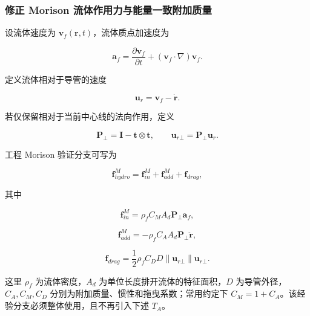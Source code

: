 \subsubsection{修正 Morison 流体作用力与能量一致附加质量}\label{sec:rod-1-4-4}

设流体速度为 \(\mathbf{v}_{f}\left( \mathbf{r},t \right)\)，流体质点加速度为

\begin{equation}
\label{eq:rod-1-49}
\mathbf{a}_{f} = \frac{\partial\mathbf{v}_{f}}{\partial t} + \left( \mathbf{v}_{f} \cdot \nabla \right)\mathbf{v}_{f}.
\end{equation}

定义流体相对于导管的速度

\begin{equation}
\label{eq:rod-1-50}
\mathbf{u}_{r} = \mathbf{v}_{f} - \dot{\mathbf{r}}.
\end{equation}

若仅保留相对于当前中心线的法向作用，定义

\begin{equation}
\label{eq:rod-1-51}
\mathbf{P}_{\bot} = \mathbf{I} - \mathbf{t} \otimes \mathbf{t},\quad\quad\mathbf{u}_{r\bot} = \mathbf{P}_{\bot}\mathbf{u}_{r}.
\end{equation}

工程 Morison 验证分支可写为\cite{Morison1950,Newman1977MarineHydrodynamics,Faltinsen1990SeaLoads}

\begin{equation}
\label{eq:rod-1-52}
\mathbf{f}_{hydro}^{M} = \mathbf{f}_{in}^{M} + \mathbf{f}_{add}^{M} + \mathbf{f}_{drag},
\end{equation}

其中

\begin{equation}
\label{eq:rod-1-53}
\mathbf{f}_{in}^{M} = \rho_{f}C_{M}A_{d}\mathbf{P}_{\bot}\mathbf{a}_{f},
\end{equation}

\begin{equation}
\label{eq:rod-1-54}
\mathbf{f}_{add}^{M} = - \rho_{f}C_{A}A_{d}\mathbf{P}_{\bot}\ddot{\mathbf{r}},
\end{equation}

\begin{equation}
\label{eq:rod-1-55}
\mathbf{f}_{drag} = \frac{1}{2}\rho_{f}C_{D}D \parallel \mathbf{u}_{r\bot} \parallel \mathbf{u}_{r\bot}.
\end{equation}

这里 \(\rho_{f}\) 为流体密度，\(A_{d}\) 为单位长度排开流体的特征面积，\(D\) 为导管外径，\(C_{A},C_{M},C_{D}\) 分别为附加质量、惯性和拖曳系数；常用约定下 \(C_{M} = 1 + C_{A}\)。该经验分支必须整体使用，且不再引入下述 \(T_{A}\)。

